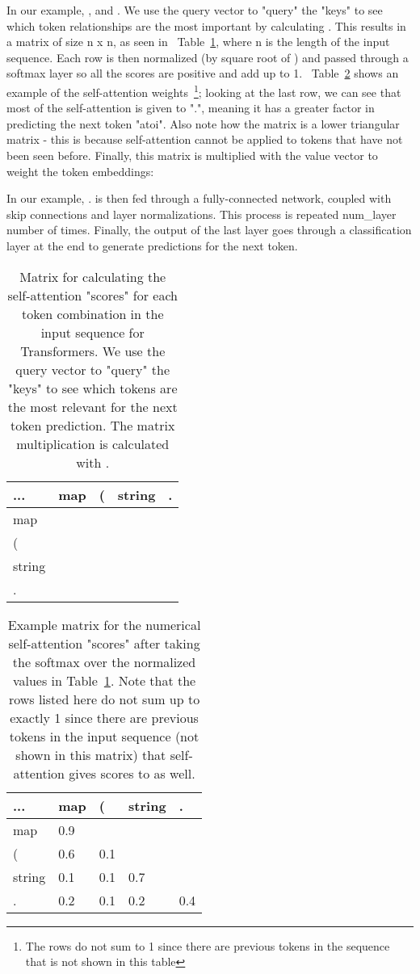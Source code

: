 \documentclass[nonacm, sigconf]{acmart}
\newcommand{\tabref}[1]{Table~\ref{#1}}
\begin{document}
In our example, , and . We use the query vector  to "query" the "keys"  to see which token relationships are the most important by calculating . This results in a matrix of size n x n, as seen in ~\tabref{tab:QK}, where n is the length of the input sequence. Each row is then normalized (by square root of ) and passed through a softmax layer so all the scores are positive and add up to 1. ~\tabref{tab:QK_softmax}  shows an example of the self-attention weights~\footnote{The rows do not sum to 1 since there are previous tokens in the sequence that is not shown in this table}; looking at the last row, we can see that most of the self-attention is given to ".", meaning it has a greater factor in predicting the next token "atoi". Also note how the matrix is a lower triangular matrix - this is because self-attention cannot be applied to tokens that have not been seen before. Finally, this matrix is multiplied with the value vector to weight the token embeddings:

In our example, .
 is then fed through a fully-connected network, coupled with skip connections and layer normalizations. This process is repeated num\_layer number of times. Finally, the output of the last layer goes through a classification layer at the end to generate predictions for the next token.


\begin{table}
\centering
\begin{tabular}{|l|l|l|l|l|}  \hline
... & map  & ( & string & . \\ \hline
map    
    &  &&& \\ 
(      
    &  
    &   && \\
string 
    &  
    &   
    &  &  \\
.   
    & 
    &   
    &       
    &  \\ 
\hline
\end{tabular}
\caption{Matrix for calculating the self-attention "scores" for each token combination in the input sequence for Transformers. We use the query vector  to "query" the "keys"  to see which tokens are the most relevant for the next token prediction. The matrix multiplication is calculated with .}
\label{tab:QK}
\end{table}

\begin{table}
\centering
\begin{tabular}{|l|l|l|l|l|}  
\hline
... & map  & ( & string & . \\ \hline
map    & 0.9 &&& \\ 
(      & 0.6 & 0.1 && \\
string & 0.1   & 0.1  &  0.7  & \\
.      &  0.2     & 0.1  &  0.2  &  0.4 \\ \hline
\end{tabular}
\caption{Example matrix for the numerical self-attention "scores" after taking the softmax over the normalized values in \tabref{tab:QK}. Note that the rows listed here do not sum up to exactly 1 since there are previous tokens in the input sequence (not shown in this matrix) that self-attention gives scores to as well.}
\label{tab:QK_softmax}
\end{table}
\end{document}
